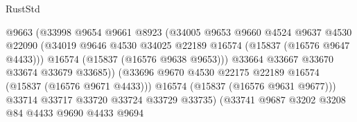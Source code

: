 \begin{lexlean}{RustStd}
\begin{coremodule}
                                          @9663
                                          (@33998
                                            @9654
                                            @9661
                                            @8923
                                            (@34005
                                              @9653
                                              @9660
                                              @4524
                                              @9637
                                              @4530
                                              @22090
                                              (@34019
                                                @9646
                                                @4530
                                                @34025
                                                @22189
                                                @16574
                                                (@15837 (@16576 @9647 @4433)))
                                              @16574
                                              (@15837 (@16576 @9638 @9653)))
                                            @33664
                                            @33667
                                            @33670
                                            @33674
                                            @33679
                                            @33685))
                                        (@33696
                                          @9670
                                          @4530
                                          @22175
                                          @22189
                                          @16574
                                          (@15837 (@16576 @9671 @4433)))
                                        @16574
                                        (@15837 (@16576 @9631 @9677)))
                                      @33714
                                      @33717
                                      @33720
                                      @33724
                                      @33729
                                      @33735)
                                    (@33741
                                      @9687
                                      @3202
                                      @3208
                                      @84
                                      @4433
                                      @9690
                                      @4433
                                      @9694

\end{coremodule}
\end{lexlean}
